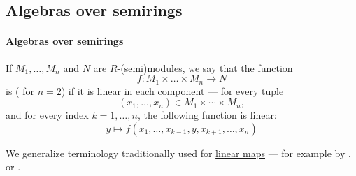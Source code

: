 \subsection{Algebras over semirings}\label{subsec:algebras_over_semirings}

\paragraph{Algebras over semirings}

\begin{definition}\label{def:multilinear_function}\mimprovised
  If \( M_1, \ldots, M_n \) and \( N \) are \( R \)-\hyperref[def:semimodule]{(semi)modules}, we say that the function
  \begin{equation*}
    f: M_1 \times \ldots \times M_n \to N
  \end{equation*}
  is  ( for \( n = 2 \)) if it is linear in each component --- for every tuple
  \begin{equation*}
    (x_1, \ldots, x_n) \in M_1 \times \cdots \times M_n,
  \end{equation*}
  and for every index \( k = 1, \ldots, n \), the following function is linear:
  \begin{equation*}
    y \mapsto f(x_1, \ldots, x_{k-1}, y, x_{k+1}, \ldots, x_n)
  \end{equation*}
\end{definition}
\begin{comments}
  \item We generalize terminology traditionally used for \hyperref[def:semimodule/homomorphism]{linear maps} --- for example by ,  or .
\end{comments}

